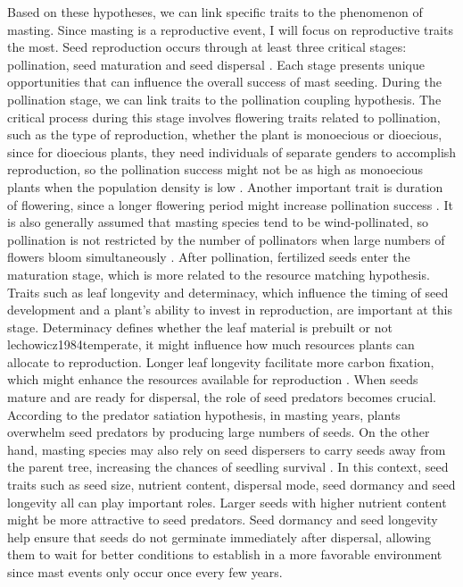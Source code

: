 \documentclass[11pt,letter]{article}
\begin{document}
Based on these hypotheses, we can link specific traits to the phenomenon of masting. Since masting is a reproductive event, I will focus on reproductive traits the most. Seed reproduction occurs through at least three critical stages: pollination, seed maturation and seed dispersal \citep{satake2021studying}. Each stage presents unique opportunities that can influence the overall success of mast seeding. During the pollination stage, we can link traits to the pollination coupling hypothesis. The critical process during this stage involves flowering traits related to pollination, such as the type of reproduction, whether the plant is monoecious or dioecious, since for dioecious plants, they need individuals of separate genders to accomplish reproduction, so the pollination success might not be as high as monoecious plants when the population density is low \citep{bawa1980evolution}. Another important trait is duration of flowering, since a longer flowering period might increase pollination success \citep{knight2005pollen}. It is also generally assumed that masting species tend to be wind-pollinated, so pollination is not restricted by the number of pollinators when large numbers of flowers bloom simultaneously \citep{bogdziewicz2017masting, bogdziewicz2020flowering}. After pollination, fertilized seeds enter the maturation stage, which is more related to the resource matching hypothesis. Traits such as leaf longevity and determinacy, which influence the timing of seed development and a plant's ability to invest in reproduction, are important at this stage. Determinacy defines whether the leaf material is prebuilt or not {lechowicz1984temperate}, it might influence how much resources plants can allocate to reproduction.  Longer leaf longevity facilitate more carbon fixation, which might enhance the resources available for reproduction \citep{adler2014functional}. When seeds mature and are ready for dispersal, the role of seed predators becomes crucial. According to the predator satiation hypothesis, in masting years, plants overwhelm seed predators by producing large numbers of seeds. On the other hand, masting species may also rely on seed dispersers to carry seeds away from the parent tree, increasing the chances of seedling survival \citep{janzen1971seed, silvertown1980evolutionary}. In this context, seed traits such as seed size, nutrient content, dispersal mode, seed dormancy and seed longevity all can play important roles. Larger seeds with higher nutrient content might be more attractive to seed predators. Seed dormancy and seed longevity help ensure that seeds do not germinate immediately after dispersal, allowing them to wait for better conditions to establish in a more favorable environment since mast events only occur once every few years.\par
\end{document}
